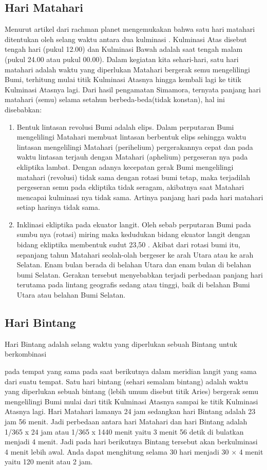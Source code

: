 \subsection{Hari Matahari}
 Menurut artikel dari rachman planet mengemukakan bahwa satu hari matahari ditentukan
 oleh selang waktu antara dua kulminasi \cite{rachmanplanet}. Kulminasi Atas disebut tengah hari (pukul 12.00)
 dan Kulminasi Bawah adalah saat tengah malam (pukul 24.00 atau pukul 00.00). 
 Dalam kegiatan kita sehari-hari, satu hari matahari adalah waktu yang diperlukan
 Matahari bergerak semu mengelilingi Bumi, terhitung mulai titik Kulminasi Atasnya
 hingga kembali lagi ke titik Kulminasi Atasnya lagi. Dari hasil pengamatan Simamora, ternyata 
 panjang hari matahari (semu) selama setahun berbeda-beda(tidak konstan), 
 hal ini disebabkan:
 \begin{enumerate}
 \item Bentuk lintasan revolusi Bumi adalah elips.
 Dalam perputaran Bumi mengelilingi Matahari membuat lintasan berbentuk elips 
 sehingga waktu lintasan mengelilingi Matahari (perihelium) 
 pergerakannya cepat dan pada waktu lintasan terjauh 
 dengan Matahari (aphelium) pergeseran nya pada ekliptika lambat. 
 Dengan adanya kecepatan gerak Bumi mengelilingi matahari (revolusi)
 tidak sama dengan rotasi bumi tetap, maka terjadilah pergeseran semu
 pada ekliptika tidak seragam, akibatnya saat Matahari mencapai 
 kulminasi nya tidak sama. Artinya panjang hari pada hari matahari 
 setiap harinya tidak sama.
 
 \item	Inklinasi ekliptika pada ekuator langit.
 Oleh sebab perputaran Bumi pada sumbu nya (rotasi) miring maka kedudukan
 bidang ekuator langit dengan bidang ekliptika membentuk sudut 23,50 .
 Akibat dari rotasi bumi itu, sepanjang tahun Matahari seolah-olah bergeser ke arah
 Utara atau ke arah Selatan. Enam bulan berada di belahan Utara dan 
 enam bulan di belahan bumi Selatan. Gerakan tersebut menyebabkan 
 terjadi perbedaan panjang hari terutama pada lintang geografis sedang
 atau tinggi, baik di belahan Bumi Utara atau belahan Bumi Selatan.
 \end{enumerate}
\subsection{Hari Bintang}

Hari Bintang adalah selang waktu yang diperlukan sebuah Bintang untuk berkombinasi 

 pada tempat yang sama pada saat berikutnya dalam meridian langit yang 
 sama dari suatu tempat. Satu hari bintang (sehari semalam bintang) adalah 
 waktu yang diperlukan sebuah bintang (lebih umum disebut titik Aries) bergerak semu
 mengelilingi Bumi mulai dari titik Kulminasi Atasnya sampai ke titik Kulminasi Atasnya 
 lagi. Hari Matahari lamanya 24 jam sedangkan hari Bintang adalah 23 jam 56 menit. 
 Jadi perbedaan antara hari Matahari dan  hari Bintang adalah 1/365 x 24 jam atau 
 1/365 x 1440 menit yaitu 3 menit 56 detik di bulatkan menjadi 4 menit. 
 Jadi pada hari berikutnya Bintang tersebut akan berkulminasi 4 menit lebih awal.
 Anda dapat menghitung selama 30 hari menjadi 30 $\times$ 4 menit yaitu 120 menit atau 2 jam. 

